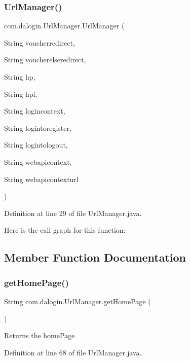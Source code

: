 \subsubsection{\texorpdfstring{Url\+Manager()}{UrlManager()}}
{\footnotesize\ttfamily com.\+dalogin.\+Url\+Manager.\+Url\+Manager (\begin{DoxyParamCaption}\item[{String}]{voucherredirect,  }\item[{String}]{voucherelseredirect,  }\item[{String}]{hp,  }\item[{String}]{hpi,  }\item[{String}]{logincontext,  }\item[{String}]{logintoregister,  }\item[{String}]{logintologout,  }\item[{String}]{webapicontext,  }\item[{String}]{webapicontexturl }\end{DoxyParamCaption})}



Definition at line 29 of file Url\+Manager.\+java.

Here is the call graph for this function\+:


\subsection{Member Function Documentation}
\mbox{\label{classcom_1_1dalogin_1_1_url_manager_a612504bd73f0ba1a8411d7866a5b2543}} 
\subsubsection{\texorpdfstring{get\+Home\+Page()}{getHomePage()}}
{\footnotesize\ttfamily String com.\+dalogin.\+Url\+Manager.\+get\+Home\+Page (\begin{DoxyParamCaption}{ }\end{DoxyParamCaption})}

\begin{DoxyReturn}{Returns}
the home\+Page 
\end{DoxyReturn}


Definition at line 68 of file Url\+Manager.\+java.

